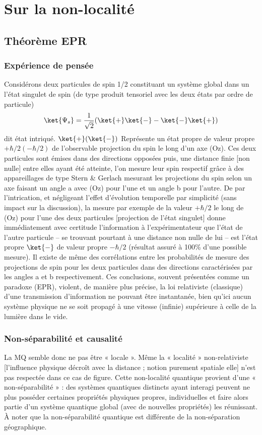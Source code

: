 \section{Sur la non-localité}
\subsection{Théorème EPR}
\subsubsection{Expérience de pensée}
Considérons deux particules de spin 1/2 constituant un système global dans un l’état
singulet de spin (de type produit tensoriel avec les deux états par ordre de particule)
\[
\ket{\Psi_s}=\frac{1}{\sqrt{2}}(\ket{+}\ket{-}-\ket{-}\ket{+})
\]
dit état intriqué. $\ket{+}(\ket{-})$ Représente un état propre de valeur propre
$+\hbar/2(-\hbar/2)$ de
l’observable projection du spin le long d’un axe (Oz). Ces deux particules sont émises dans
des directions opposées puis, une distance finie [non nulle] entre elles ayant été atteinte, l’on
mesure leur spin respectif grâce à des appareillages de type Stern \& Gerlach mesurant les
projections du spin selon un axe faisant un angle a avec (Oz) pour l’une et un angle b pour
l’autre. De par l’intrication, et négligeant l’effet d’évolution temporelle par simplicité (sans
impact sur la discussion), la mesure par exemple de la valeur $+\hbar/2$ le long de (Oz) pour
l’une des deux particules [projection de l’état singulet] donne immédiatement avec certitude
l’information à l’expérimentateur que l’état de l’autre particule – se trouvant pourtant à une
distance non nulle de lui – est l’état propre $\ket{-}$ de valeur propre $-\hbar/2$ (résultat assuré à
100\% d’une possible mesure). Il existe de même des corrélations entre les probabilités de
mesure des projections de spin pour les deux particules dans des directions caractérisées par
les angles a et b respectivement. Ces conclusions, souvent présentées comme un paradoxe
(EPR), violent, de manière plus précise, la loi relativiste (classique) d’une transmission
d’information ne pouvant être instantanée, bien qu’ici aucun système physique ne se soit
propagé à une vitesse (infinie) supérieure à celle de la lumière dans le vide.
\subsubsection{Non-séparabilité et causalité}
La MQ semble donc ne pas être « locale ». Même la « localité » non-relativiste [l’influence
physique décroît avec la distance ; notion purement spatiale elle] n’est pas respectée dans ce
cas de figure. Cette non-localité quantique provient d’une « non-séparabilité » : des
systèmes quantiques distincts ayant interagi peuvent ne plus posséder certaines propriétés
physiques propres, individuelles et faire alors partie d’un système quantique global (avec de
nouvelles propriétés) les réunissant. À noter que la non-séparabilité quantique est différente
de la non-séparation géographique.

